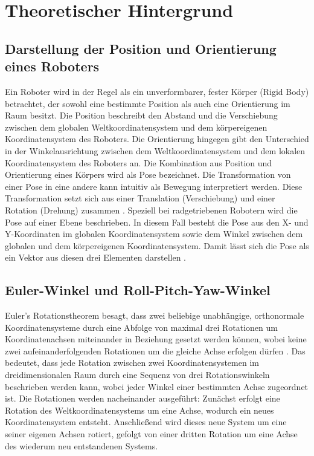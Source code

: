 \section{Theoretischer Hintergrund}

\subsection{Darstellung der Position und Orientierung eines Roboters}
Ein Roboter wird in der Regel als ein unverformbarer, fester Körper (Rigid Body) betrachtet, der sowohl eine bestimmte Position als auch eine Orientierung im Raum besitzt.
Die Position beschreibt den Abstand und die Verschiebung zwischen dem globalen Weltkoordinatensystem und dem körpereigenen Koordinatensystem des Roboters.
Die Orientierung hingegen gibt den Unterschied in der Winkelausrichtung zwischen dem Weltkoordinatensystem und dem lokalen Koordinatensystem des Roboters an.
Die Kombination aus Position und Orientierung eines Körpers wird als Pose bezeichnet. Die Transformation von einer Pose in eine andere kann intuitiv als Bewegung interpretiert werden.
Diese Transformation setzt sich aus einer Translation (Verschiebung) und einer Rotation (Drehung) zusammen \cite[24-27]{Robotics_Vision_and_Control}.
Speziell bei radgetriebenen Robotern wird die Pose auf einer Ebene beschrieben.
In diesem Fall besteht die Pose aus den X- und Y-Koordinaten im globalen Koordinatensystem sowie dem Winkel zwischen dem globalen und dem körpereigenen Koordinatensystem.
Damit lässt sich die Pose als ein Vektor aus diesen drei Elementen darstellen \cite[59]{autonomous_mobile_robots}.


\subsection{Euler-Winkel und Roll-Pitch-Yaw-Winkel}
Euler’s Rotationstheorem besagt, dass zwei beliebige unabhängige,
orthonormale Koordinatensysteme durch eine Abfolge von maximal drei Rotationen um Koordinatenachsen miteinander in Beziehung gesetzt werden können,
wobei keine zwei aufeinanderfolgenden Rotationen um die gleiche Achse erfolgen dürfen \cite[136]{Quaternions_and_Rotation_Sequences_A_Primer_with_Applications_to_Orbits_Aerospace_and_Virtual_Reality}.
Das bedeutet, dass jede Rotation zwischen zwei Koordinatensystemen im dreidimensionalen Raum durch eine Sequenz von drei Rotationswinkeln beschrieben werden kann,
wobei jeder Winkel einer bestimmten Achse zugeordnet ist. Die Rotationen werden nacheinander ausgeführt:
Zunächst erfolgt eine Rotation des Weltkoordinatensystems um eine Achse, wodurch ein neues Koordinatensystem entsteht.
Anschließend wird dieses neue System um eine seiner eigenen Achsen rotiert, gefolgt von einer dritten Rotation um eine Achse des wiederum neu entstandenen Systems.

